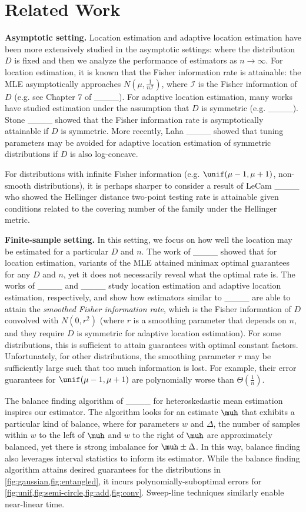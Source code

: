 \section{Related Work}
\textbf{Asymptotic setting. } Location estimation and adaptive location estimation have been more extensively studied in the asymptotic settings: where the distribution $D$ is fixed and then we analyze the performance of estimators as $n \rightarrow \infty$. For location estimation, it is known that the Fisher information rate is attainable: the MLE asymptotically approaches $N(\mu,\tfrac{1}{n\mathcal{I}})$, where $\mathcal{I}$ is the Fisher information of $D$ (e.g. see Chapter 7 of ____). For adaptive location estimation, many works have studied estimation under the assumption that $D$ is symmetric (e.g. ____). Stone ____ showed that the Fisher information rate is asymptotically attainable if $D$ is symmetric.  More recently, Laha ____ showed that tuning parameters may be avoided for adaptive location estimation of symmetric distributions if $D$ is also log-concave. 

For distributions with infinite Fisher information (e.g. $\unif(\mu - 1, \mu + 1)$, non-smooth distributions), it is perhaps sharper to consider a result of LeCam ____ who showed the Hellinger distance two-point testing rate is attainable given conditions related to the covering number of the family under the Hellinger metric.


\textbf{Finite-sample setting. } In this setting, we focus on how well the location may be estimated for a particular $D$ and $n$. The work of ____ showed that for location estimation, variants of the MLE attained minimax optimal guarantees for any $D$ and $n$, yet it does not necessarily reveal what the optimal rate is. The works of ____ and ____ study location estimation and adaptive location estimation, respectively, and show how estimators similar to ____ are able to attain the \textit{smoothed Fisher information rate}, which is the Fisher information of $D$ convolved with $N(0,r^2)$ (where $r$ is a smoothing parameter that depends on $n$, and they require $D$ is symmetric for adaptive location estimation). For some distributions, this is sufficient to attain guarantees with optimal constant factors. Unfortunately, for other distributions, the smoothing parameter $r$ may be sufficiently large such that too much information is lost. For example, their error guarantees for $\unif(\mu-1,\mu+1)$ are polynomially worse than $\Theta(\frac{1}{n})$.

The balance finding algorithm of ____ for heteroskedastic mean estimation inspires our estimator. The algorithm looks for an estimate $\muh$ that exhibits a particular kind of balance, where for parameters $w$ and $\Delta$, the number of samples within $w$ to the left of $\muh$ and $w$ to the right of $\muh$ are approximately balanced, yet there is strong imbalance for $\muh \pm \Delta$. In this way, balance finding also leverages interval statistics to inform its estimator. While the balance finding algorithm attains desired guarantees for the distributions in \cref{fig:gaussian,fig:entangled}, it incurs polynomially-suboptimal errors for \cref{fig:unif,fig:semi-circle,fig:add,fig:conv}. Sweep-line techniques similarly enable near-linear time.

